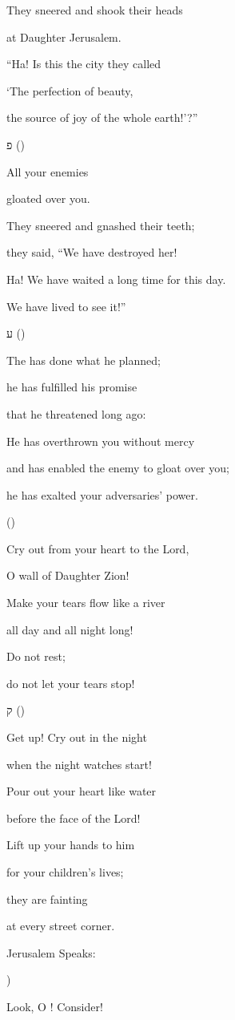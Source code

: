 {\par }{\Q They sneered and shook their heads
\par }{\Q at Daughter Jerusalem.
\par }{\Q “Ha! Is this the city they called
\par }{\Q ‘The perfection of beauty,
\par }{\Q the source of joy of the whole earth!’?”
\par }{\SH פ ({})
\par }{\Q {}All your enemies
\par }{\Q gloated over you.
\par }{\Q They sneered and gnashed their teeth;
\par }{\Q they said, “We have destroyed her!
\par }{\Q Ha! We have waited a long time for this day.
\par }{\Q We have lived to see it!”
\par }{\SH ע ({})
\par }{\Q {}The
{} has done what he planned;
\par }{\Q he has fulfilled his promise
\par }{\Q that he threatened long ago:
\par }{\Q He has overthrown you without mercy
\par }{\Q and has enabled the enemy to gloat over you;
\par }{\Q he has exalted your adversaries’ power.
\par }{\SH 
{} ({})
\par }{\Q {}Cry out from your heart to the Lord,
\par }{\Q O wall of Daughter Zion!
\par }{\Q Make your tears flow like a river
\par }{\Q all day and all night long!
\par }{\Q Do not rest;
\par }{\Q do not let your tears stop!
\par }{\SH ק ({})
\par }{\Q {}Get up! Cry out in the night
\par }{\Q when the night watches start!
\par }{\Q Pour out your heart like water
\par }{\Q before the face of the Lord!
\par }{\Q Lift up your hands to him
\par }{\Q for your children’s lives;
\par }{\Q they are fainting
\par }{\Q at every street corner.
\par }{\SH Jerusalem Speaks:
\par }{\SH 
{})
\par }{\Q {}Look, O
{}! Consider!

}
